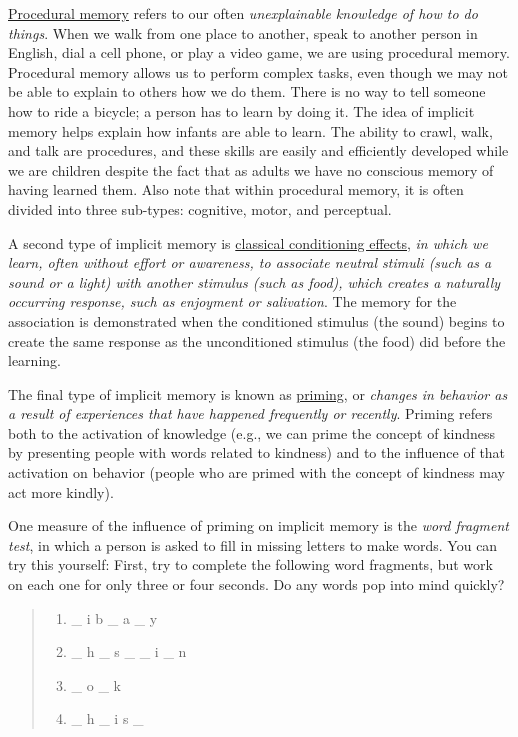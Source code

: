 \documentclass[
]{krantz}
\providecommand{\tightlist}{%
  \setlength{\itemsep}{0pt}\setlength{\parskip}{0pt}}
\begin{document}
\hyperref[procedural-memory]{Procedural memory} refers to our often \emph{unexplainable knowledge of how to do things}. When we walk from one place to another, speak to another person in English, dial a cell phone, or play a video game, we are using procedural memory. Procedural memory allows us to perform complex tasks, even though we may not be able to explain to others how we do them. There is no way to tell someone how to ride a bicycle; a person has to learn by doing it. The idea of implicit memory helps explain how infants are able to learn. The ability to crawl, walk, and talk are procedures, and these skills are easily and efficiently developed while we are children despite the fact that as adults we have no conscious memory of having learned them. Also note that within procedural memory, it is often divided into three sub-types: cognitive, motor, and perceptual.

A second type of implicit memory is \hyperref[classical-conditioning-effects]{classical conditioning effects}, \emph{in which we learn, often without effort or awareness, to associate neutral stimuli (such as a sound or a light) with another stimulus (such as food), which creates a naturally occurring response, such as enjoyment or salivation}. The memory for the association is demonstrated when the conditioned stimulus (the sound) begins to create the same response as the unconditioned stimulus (the food) did before the learning.

The final type of implicit memory is known as \hyperref[priming]{priming}, or \emph{changes in behavior as a result of experiences that have happened frequently or recently}. Priming refers both to the activation of knowledge (e.g., we can prime the concept of kindness by presenting people with words related to kindness) and to the influence of that activation on behavior (people who are primed with the concept of kindness may act more kindly).

One measure of the influence of priming on implicit memory is the \emph{word fragment test}, in which a person is asked to fill in missing letters to make words. You can try this yourself: First, try to complete the following word fragments, but work on each one for only three or four seconds. Do any words pop into mind quickly?

\begin{quote}
\begin{enumerate}
\def\labelenumi{\arabic{enumi}.}
\tightlist
\item
  \_ i b \_ a \_ y
\item
  \_ h \_ s \_ \_ i \_ n
\item
  \_ o \_ k
\item
  \_ h \_ i s \_
\end{enumerate}
\end{quote}
\end{document}
